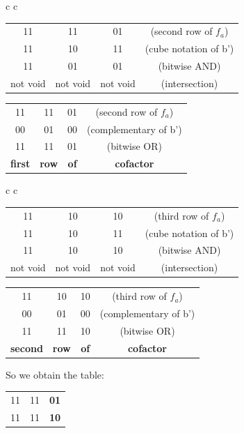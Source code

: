 \begin{center}
	\begin{tabular}{c c}
		\begin{tabular}{c c c c}
			11 & 11 & 01 & (second row of $f_{a}$) \\ 
			11 & 10 & 11 & (cube notation of b')\\ \hline 
			11 & 01 & 01 & (bitwise AND) \\ \hline
			not void & not void & not void & (intersection)
		\end{tabular}
		\quad\quad
		\begin{tabular}{c  c  c c}
			11 & 11 & 01 & (second row of $f_{a}$) \\ 
			00 & 01 & 00 & (complementary of b')\\ \hline 
			11 & 11 & 01 & (bitwise OR) \\ \hline
			\textbf{first} & \textbf{row} & \textbf{of} & \textbf{cofactor} \\
		\end{tabular}
	\end{tabular}
\end{center}

\begin{center}
	\begin{tabular}{c c}
		\begin{tabular}{c c c c}
			11 & 10 & 10 & (third row of $f_{a}$) \\ 
			11 & 10 & 11 & (cube notation of b')\\ \hline 
			11 & 10 & 10 & (bitwise AND) \\ \hline
			not void & not void & not void & (intersection)
		\end{tabular}
		\quad\quad
		\begin{tabular}{c  c  c c}
			11 & 10 & 10 & (third row of $f_{a}$) \\ 
			00 & 01 & 00 & (complementary of b')\\ \hline 
			11 & 11 & 10 & (bitwise OR) \\ \hline
			\textbf{second} & \textbf{row} & \textbf{of} & \textbf{cofactor} \\
		\end{tabular}
	\end{tabular}
\end{center}

So we obtain the table: 

\begin{center}
	\begin{tabular}{c c c}
		\hline
		11 & 11 & \textbf{01} \\ 
		11 & 11 & \textbf{10} \\ \hline 
		
	\end{tabular}
\end{center}

